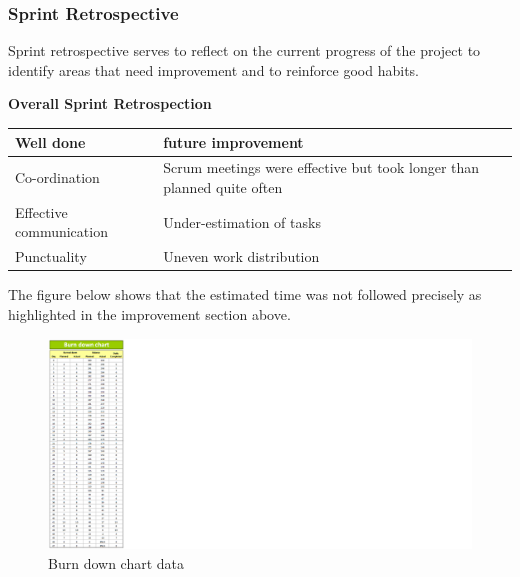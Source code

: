 \documentclass[10pt,onecolumn]{MainDocument}
\begin{document}
\newpage

\subsubsection{Sprint Retrospective}

Sprint retrospective serves to reflect on the current progress of the project to identify areas that need improvement and to reinforce good habits.

\textbf{Overall Sprint Retrospection}

	\begin{tabular}{ | p{5cm} | p{4cm} | }
		\hline
		\textbf{Well done} & \textbf{future improvement}\\ \hline
		Co-ordination 	& Scrum meetings were effective but took longer than planned quite often\\ \hline	
		Effective communication& Under-estimation of tasks \\ \hline
		Punctuality & Uneven work distribution			
		\\ \hline
	\end{tabular}
	
	\newpage

The figure below shows that the estimated time was not followed precisely as highlighted in the improvement section above.	
	
	
\begin{center}
\begin{figure}[h]
\centering
\includegraphics[trim = {0 0cm  28cm 0cm},clip, scale=0.7]{burndown1}
\caption{Burn down chart data}
\end{figure}
\end{center}

\newpage
\end{document}
